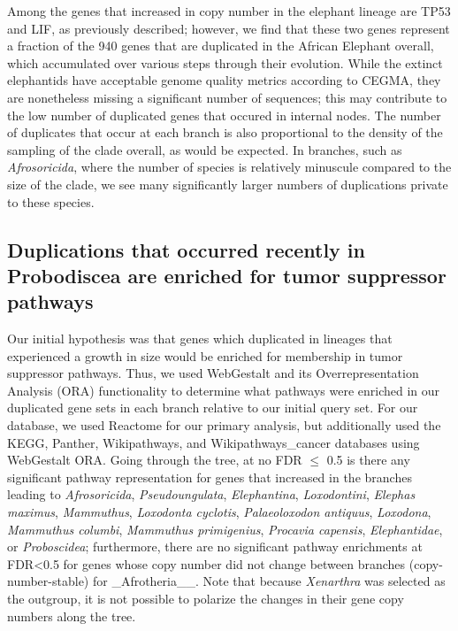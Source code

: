 \documentclass[]{elsarticle} %
\begin{document}
Among the genes that increased in copy number in the elephant lineage are TP53 and LIF, as previously described; however, we find that these two genes represent a fraction of the 940 genes that are duplicated in the African Elephant overall, which accumulated over various steps through their evolution. While the extinct elephantids have acceptable genome quality metrics according to CEGMA, they are nonetheless missing a significant number of sequences; this may contribute to the low number of duplicated genes that occured in internal nodes. The number of duplicates that occur at each branch is also proportional to the density of the sampling of the clade overall, as would be expected. In branches, such as \emph{Afrosoricida}, where the number of species is relatively minuscule compared to the size of the clade, we see many significantly larger numbers of duplications private to these species.

\hypertarget{duplications-that-occurred-recently-in-probodiscea-are-enriched-for-tumor-suppressor-pathways}{%
\subsection{Duplications that occurred recently in Probodiscea are enriched for tumor suppressor pathways}\label{duplications-that-occurred-recently-in-probodiscea-are-enriched-for-tumor-suppressor-pathways}}

Our initial hypothesis was that genes which duplicated in lineages that experienced a growth in size would be enriched for membership in tumor suppressor pathways. Thus, we used WebGestalt and its Overrepresentation Analysis (ORA) functionality to determine what pathways were enriched in our duplicated gene sets in each branch relative to our initial query set. For our database, we used Reactome for our primary analysis, but additionally used the KEGG, Panther, Wikipathways, and Wikipathways\_cancer databases using WebGestalt ORA. Going through the tree, at no FDR \(\leq\) 0.5 is there any significant pathway representation for genes that increased in the branches leading to \emph{Afrosoricida}, \emph{Pseudoungulata}, \emph{Elephantina}, \emph{Loxodontini}, \emph{Elephas maximus}, \emph{Mammuthus}, \emph{Loxodonta cyclotis}, \emph{Palaeoloxodon antiquus}, \emph{Loxodona}, \emph{Mammuthus columbi}, \emph{Mammuthus primigenius}, \emph{Procavia capensis}, \emph{Elephantidae}, or \emph{Proboscidea}; furthermore, there are no significant pathway enrichments at FDR\textless{}0.5 for genes whose copy number did not change between branches (copy-number-stable) for \_Afrotheria\_\_. Note that because \emph{Xenarthra} was selected as the outgroup, it is not possible to polarize the changes in their gene copy numbers along the tree.
\end{document}

